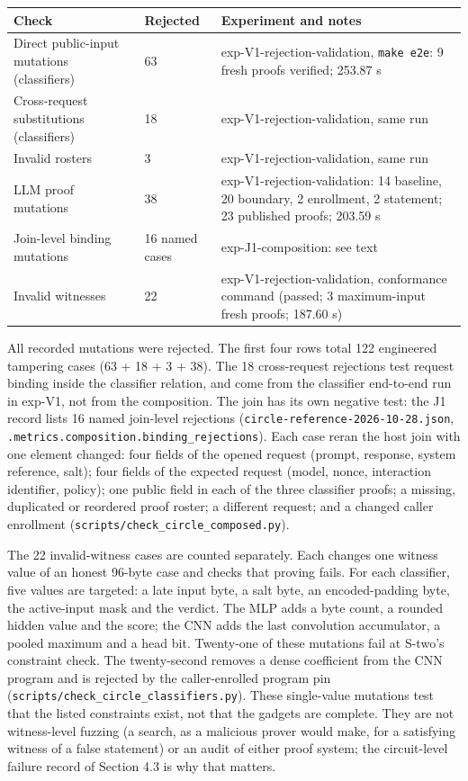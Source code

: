 \documentclass[11pt]{article}
\begin{document}
{\small
\begin{xltabular}{\linewidth}{XXX}
\toprule
\textbf{Check} & \textbf{Rejected} & \textbf{Experiment and notes} \\ \midrule
\endhead
Direct public-input mutations (classifiers) & 63 & exp-V1-rejection-validation, \texttt{make e2e}: 9 fresh proofs verified; 253.87 s \\
Cross-request substitutions (classifiers) & 18 & exp-V1-rejection-validation, same run \\
Invalid rosters & 3 & exp-V1-rejection-validation, same run \\
LLM proof mutations & 38 & exp-V1-rejection-validation: 14 baseline, 20 boundary, 2 enrollment, 2 statement; 23 published proofs; 203.59 s \\
Join-level binding mutations & 16 named cases & exp-J1-composition: see text \\
Invalid witnesses & 22 & exp-V1-rejection-validation, conformance command (passed; 3 maximum-input fresh proofs; 187.60 s) \\
\bottomrule
\end{xltabular}}

All recorded mutations were rejected. The first four rows total 122 engineered tampering cases (63 + 18 + 3 + 38). The 18 cross-request rejections test request binding inside the classifier relation, and come from the classifier end-to-end run in exp-V1, not from the composition. The join has its own negative test: the J1 record lists 16 named join-level rejections (\texttt{circle-\allowbreak{}reference-\allowbreak{}2026-\allowbreak{}10-\allowbreak{}28.\allowbreak{}json}, \texttt{.\allowbreak{}metrics.\allowbreak{}composition.\allowbreak{}binding\_\allowbreak{}rejections}). Each case reran the host join with one element changed: four fields of the opened request (prompt, response, system reference, salt); four fields of the expected request (model, nonce, interaction identifier, policy); one public field in each of the three classifier proofs; a missing, duplicated or reordered proof roster; a different request; and a changed caller enrollment (\texttt{scripts/\allowbreak{}check\_\allowbreak{}circle\_\allowbreak{}composed.\allowbreak{}py}).

The 22 invalid-witness cases are counted separately. Each changes one witness value of an honest 96-byte case and checks that proving fails. For each classifier, five values are targeted: a late input byte, a salt byte, an encoded-padding byte, the active-input mask and the verdict. The MLP adds a byte count, a rounded hidden value and the score; the CNN adds the last convolution accumulator, a pooled maximum and a head bit. Twenty-one of these mutations fail at S-two's constraint check. The twenty-second removes a dense coefficient from the CNN program and is rejected by the caller-enrolled program pin (\texttt{scripts/\allowbreak{}check\_\allowbreak{}circle\_\allowbreak{}classifiers.\allowbreak{}py}). These single-value mutations test that the listed constraints exist, not that the gadgets are complete. They are not witness-level fuzzing (a search, as a malicious prover would make, for a satisfying witness of a false statement) or an audit of either proof system; the circuit-level failure record of Section 4.3 is why that matters.
\end{document}
